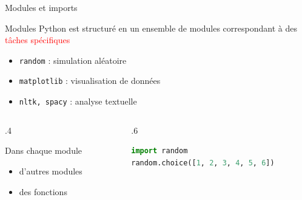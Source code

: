 \begin{frame}[fragile]{Modules et imports}
    \begin{block}{Modules}
        \medskip
        Python est structuré en un ensemble de modules correspondant à des \textcolor{red}{tâches spécifiques}
        \begin{itemize}
            \item \texttt{random} : simulation aléatoire
            \item \texttt{matplotlib} : visualisation de données
            \item \texttt{nltk, spacy} : analyse textuelle
        \end{itemize}
    \end{block}

    \begin{columns}
        \begin{column}{.4\textwidth}
            \begin{block}{Dans chaque module}
                \medskip
                \begin{itemize}
                    \item d'autres modules
                    \item des fonctions
                \end{itemize}
            \end{block}
        \end{column}

        \begin{column}{.6\textwidth}
\begin{lstlisting}[language=Python, morekeywords={}, numbers=none]
import random
random.choice([1, 2, 3, 4, 5, 6])
\end{lstlisting}
        \end{column}
    \end{columns}


\end{frame}


